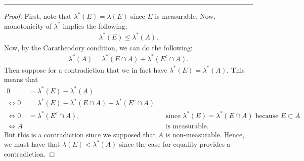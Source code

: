\documentclass[leqno]{article}
\theoremstyle{nonumberplain}
\newtheorem{proof}{Proof}
\begin{document}
\noindent\rule[0.5ex]{\linewidth}{1pt}

\begin{proof}
First, note that $\lambda^*(E)=\lambda(E)$ since $E$ is measurable. Now, monotonicity of $\lambda^*$ implies the following:
\begin{align*}
\lambda^*(E)\leq \lambda^*(A).
\end{align*}
Now, by the Caratheodory condition, we can do the following:
\begin{align*}
\lambda^*(A)=\lambda^*(E\cap A)+\lambda^*(E^c\cap A).
\end{align*}
Then suppose for a contradiction that we in fact have $\lambda^*(E)=\lambda^*(A)$.  This means that
\begin{align*}
0&=\lambda^*(E)-\lambda^*(A)\\
\iff 0&= \lambda^*(E)-\lambda^*(E\cap A)-\lambda^*(E^c \cap A)\\
\iff 0&= \lambda^*(E^c\cap A), && \textrm{since $\lambda^*(E)=\lambda^*(E\cap A)$ because $E\subset A$}\\
\iff A &&&\textrm{is measurable}.
\end{align*}
But this is a contradiction since we supposed that $A$ is non-measurable. Hence, we must have that $\lambda(E)<\lambda^*(A)$ since the case for equality provides a contradiction.
\end{proof}

\pagebreak
\end{document}
